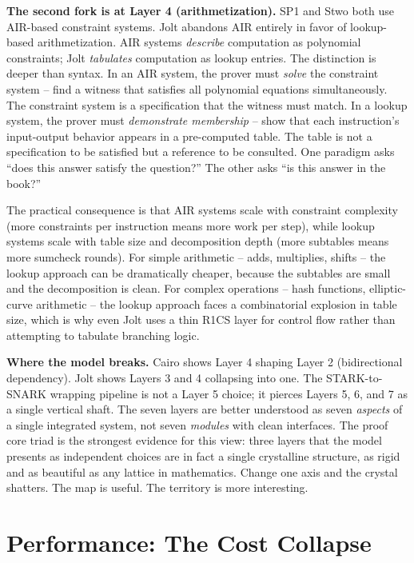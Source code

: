 \documentclass[
  11pt,
  openany]{report}
\renewcommand{\textbf}[1]{{\bfseries\color{MidnightBold}#1}}
\begin{document}
\textbf{The second fork is at Layer 4 (arithmetization).} SP1 and Stwo both use
AIR-based constraint systems. Jolt abandons AIR entirely in favor of
lookup-based arithmetization. AIR systems \emph{describe} computation as
polynomial constraints; Jolt \emph{tabulates} computation as lookup entries. The
distinction is deeper than syntax. In an AIR system, the prover must
\emph{solve} the constraint system -- find a witness that satisfies all
polynomial equations simultaneously. The constraint system is a specification
that the witness must match. In a lookup system, the prover must
\emph{demonstrate membership} -- show that each instruction's input-output
behavior appears in a pre-computed table. The table is not a specification to be
satisfied but a reference to be consulted. One paradigm asks ``does this answer
satisfy the question?'' The other asks ``is this answer in the book?''

The practical consequence is that AIR systems scale with constraint complexity
(more constraints per instruction means more work per step), while lookup
systems scale with table size and decomposition depth (more subtables means more
sumcheck rounds). For simple arithmetic -- adds, multiplies, shifts -- the
lookup approach can be dramatically cheaper, because the subtables are small and
the decomposition is clean. For complex operations -- hash functions,
elliptic-curve arithmetic -- the lookup approach faces a combinatorial explosion
in table size, which is why even Jolt uses a thin R1CS layer for control flow
rather than attempting to tabulate branching logic.

\textbf{Where the model breaks.} Cairo shows Layer 4 shaping Layer 2
(bidirectional dependency). Jolt shows Layers 3 and 4 collapsing into one. The
STARK-to-SNARK wrapping pipeline is not a Layer 5 choice; it pierces Layers 5,
6, and 7 as a single vertical shaft. The seven layers are better understood as
seven \emph{aspects} of a single integrated system, not seven \emph{modules}
with clean interfaces. The proof core triad is the strongest evidence for this
view: three layers that the model presents as independent choices are in fact a
single crystalline structure, as rigid and as beautiful as any lattice in
mathematics. Change one axis and the crystal shatters. The map is useful. The
territory is more interesting.

\section{Performance: The Cost Collapse}\label{performance-the-cost-collapse}
\end{document}
